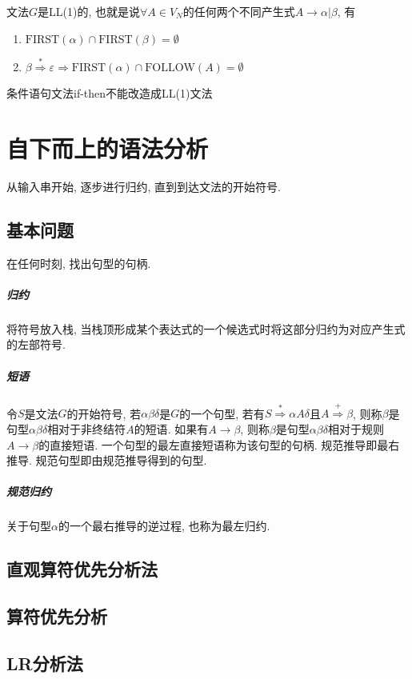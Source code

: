             文法$G$是LL(1)的, 也就是说$\forall A\in V_N$的任何两个不同产生式$A\to \alpha|\beta$, 有
            \begin{enumerate}
                \item $\textrm{FIRST}(\alpha)\cap\textrm{FIRST}(\beta)=\emptyset$
                \item $\beta\stackrel{*}{\Rightarrow}\varepsilon\Rightarrow\textrm{FIRST}(\alpha)\cap\textrm{FOLLOW}(A)=\emptyset$
            \end{enumerate}

            条件语句文法if-then不能改造成LL(1)文法

\section{自下而上的语法分析}

    从输入串开始, 逐步进行\textsf{归约}, 直到到达文法的开始符号.

    \subsection{基本问题}

        在任何时刻, 找出句型的句柄.

        \subparagraph{归约} 将符号放入栈, 当栈顶形成某个表达式的一个候选式时将这部分归约为对应产生式的左部符号.

        \subparagraph{短语} 令$S$是文法$G$的开始符号, 若$\alpha\beta\delta$是$G$的一个句型, 若有$S\stackrel{*}{\Rightarrow}\alpha A\delta$且$A\stackrel{+}{\Rightarrow}\beta$, 则称$\beta$是句型$\alpha\beta\delta$相对于非终结符$A$的\textsf{短语}. 如果有$A\to\beta$, 则称$\beta$是句型$\alpha\beta\delta$相对于规则$A\to\beta$的\textsf{直接短语}. 一个句型的\textsf{最左直接短语}称为该句型的\textsf{句柄}. \textsf{规范推导}即最右推导. \textsf{规范句型}即由规范推导得到的句型.


        \subparagraph{规范归约} 关于句型$\alpha$的一个最右推导的逆过程, 也称为\textsf{最左归约}.

    \subsection{直观算符优先分析法}

    \subsection{算符优先分析}

    \subsection{LR分析法}

